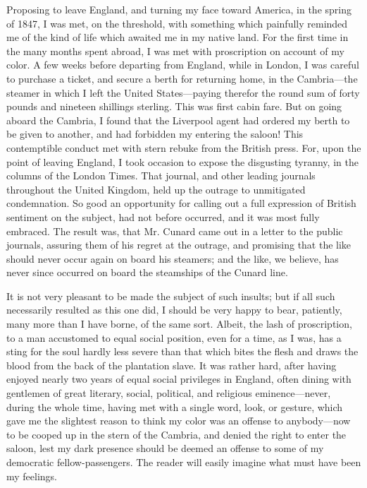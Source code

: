 Proposing to leave England, and turning my face toward America, in the
spring of 1847, I was met, on the threshold, with something which
painfully reminded me of the kind of life which awaited me in my native
land. For the first time in the many months spent abroad, I was met with
proscription on account of my color. A few weeks before departing from
England, while in London, I was careful to purchase a ticket, and secure
a berth for returning home, in the Cambria---the steamer in which I left
the United States---paying therefor the round sum of forty pounds and
nineteen shillings sterling. This was first cabin fare. But on going
aboard the Cambria, I found that the Liverpool agent had ordered my
berth to be given to another, and had forbidden my entering the saloon!
This contemptible conduct met with stern rebuke from the British press.
For, upon the point of leaving England, I took occasion to expose the
disgusting tyranny, in the columns of the London Times. That journal,
and other leading journals throughout the United Kingdom, held up the
outrage to unmitigated condemnation. So good an opportunity for calling
out a full expression of British sentiment on the subject, had not
before occurred, and it was most fully embraced. The result {}was, that
Mr. Cunard came out in a letter to the public journals, assuring them of
his regret at the outrage, and promising that the like should never
occur again on board his steamers; and the like, we believe, has never
since occurred on board the steamships of the Cunard line.

It is not very pleasant to be made the subject of such insults; but if
all such necessarily resulted as this one did, I should be very happy to
bear, patiently, many more than I have borne, of the same sort. Albeit,
the lash of proscription, to a man accustomed to equal social position,
even for a time, as I was, has a sting for the soul hardly less severe
than that which bites the flesh and draws the blood from the back of the
plantation slave. It was rather hard, after having enjoyed nearly two
years of equal social privileges in England, often dining with gentlemen
of great literary, social, political, and religious eminence---never,
during the whole time, having met with a single word, look, or gesture,
which gave me the slightest reason to think my color was an offense to
anybody---now to be cooped up in the stern of the Cambria, and denied
the right to enter the saloon, lest my dark presence should be deemed an
offense to some of my democratic fellow-passengers. The reader will
easily imagine what must have been my feelings.

